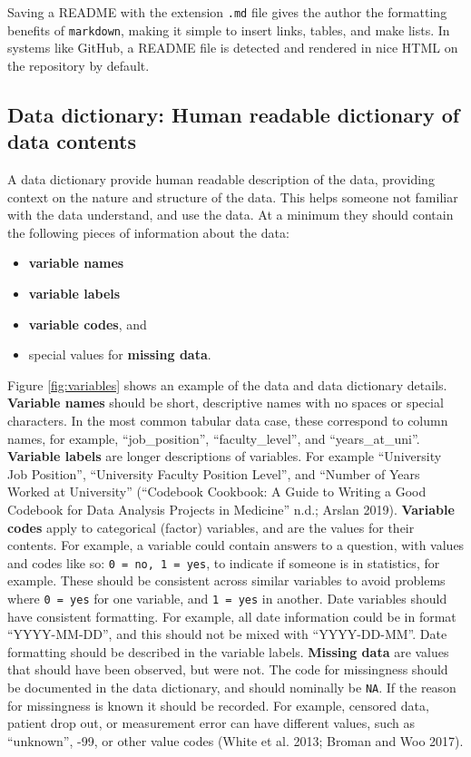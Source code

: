 \documentclass[
]{article}
\providecommand{\tightlist}{%
  \setlength{\itemsep}{0pt}\setlength{\parskip}{0pt}}
\begin{document}
Saving a README with the extension \texttt{.md} file gives the author the formatting benefits of \texttt{markdown}, making it simple to insert links, tables, and make lists. In systems like GitHub, a README file is detected and rendered in nice HTML on the repository by default.

\hypertarget{data-dictionary}{%
\subsection{Data dictionary: Human readable dictionary of data contents}\label{data-dictionary}}

A data dictionary provide human readable description of the data, providing context on the nature and structure of the data. This helps someone not familiar with the data understand, and use the data. At a minimum they should contain the following pieces of information about the data:

\begin{itemize}
\tightlist
\item
  \textbf{variable names}
\item
  \textbf{variable labels}
\item
  \textbf{variable codes}, and
\item
  special values for \textbf{missing data}.
\end{itemize}

Figure \ref{fig:variables} shows an example of the data and data dictionary details.
\textbf{Variable names} should be short, descriptive names with no spaces or special characters. In the most common tabular data case, these correspond to column names, for example, ``job\_position'', ``faculty\_level'', and ``years\_at\_uni''. \textbf{Variable labels} are longer descriptions of variables. For example ``University Job Position'', ``University Faculty Position Level'', and ``Number of Years Worked at University'' (``Codebook Cookbook: A Guide to Writing a Good Codebook for Data Analysis Projects in Medicine'' n.d.; Arslan 2019). \textbf{Variable codes} apply to categorical (factor) variables, and are the values for their contents. For example, a variable could contain answers to a question, with values and codes like so: \texttt{0\ =\ no,\ 1\ =\ yes}, to indicate if someone is in statistics, for example. These should be consistent across similar variables to avoid problems where \texttt{0\ =\ yes} for one variable, and \texttt{1\ =\ yes} in another. Date variables should have consistent formatting. For example, all date information could be in format ``YYYY-MM-DD'', and this should not be mixed with ``YYYY-DD-MM''. Date formatting should be described in the variable labels. \textbf{Missing data} are values that should have been observed, but were not. The code for missingness should be documented in the data dictionary, and should nominally be \texttt{NA}. If the reason for missingness is known it should be recorded. For example, censored data, patient drop out, or measurement error can have different values, such as ``unknown'', -99, or other value codes (White et al. 2013; Broman and Woo 2017).
\end{document}
